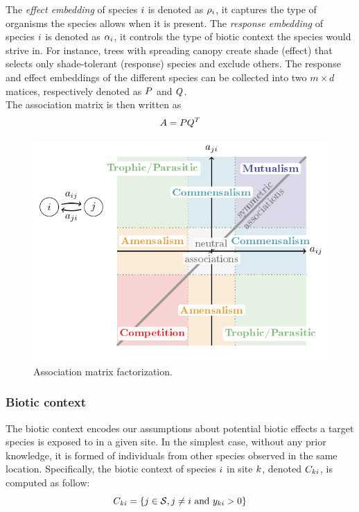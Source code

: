 \documentclass[10pt,a4paper]{article}
\begin{document}
The \emph{effect embedding} of species $i$ is denoted as $\rho_i$, it captures the type of organisms the species allows when it is present. The \emph{response embedding} of species $i$ is denoted as $\alpha_i$, it controls the type of biotic context the species would strive in. For instance, trees with spreading canopy create shade (effect) that selects only shade-tolerant (response) species and exclude others. The response and effect embeddings of the different species can be collected into two $m\times d$ matices, respectively denoted as $P$ and $Q$. \\

The association matrix is then written as
\begin{equation*}
	A = PQ^{T}
\end{equation*}

\begin{figure}[bthp]
  \centering
  \includegraphics[page=2]{tikz_figures.pdf}
  \caption{Association matrix factorization.}
  \label{factoriz}
\end{figure}

\subsubsection{Biotic context}
The biotic context encodes our assumptions about potential biotic effects a target species is exposed to in a given site. In the simplest case, without any prior knowledge, it is formed of individuals from other species observed in the same location. Specifically, the biotic context of species $i$ in site $k$, denoted $C_{ki}$, is computed as follow:
\begin{equation*}
C_{ki} = \{j \in \mathcal{S}, j \neq i ~\text{and}~ y_{ki} > 0 \}
\end{equation*}
\end{document}
